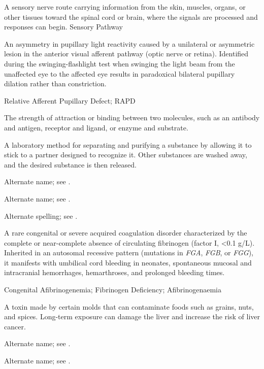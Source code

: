  A sensory nerve route carrying information from the skin, muscles, organs, or other tissues toward the spinal cord or brain, where the signals are processed and responses can begin.
\synonyms
Sensory Pathway

 An asymmetry in pupillary light reactivity caused by a unilateral or asymmetric lesion in the anterior visual afferent pathway (optic nerve or retina). Identified during the swinging-flashlight test when swinging the light beam from the unaffected eye to the affected eye results in paradoxical bilateral pupillary dilation rather than constriction.

\synonyms
Relative Afferent Pupillary Defect; RAPD

 The strength of attraction or binding between two molecules, such as an antibody and antigen, receptor and ligand, or enzyme and substrate.

 A laboratory method for separating and purifying a substance by allowing it to stick to a partner designed to recognize it. Other substances are washed away, and the desired substance is then released.

 Alternate name; see .

 Alternate name; see .

 Alternate spelling; see .

 A rare congenital or severe acquired coagulation disorder characterized by the complete or near-complete absence of circulating fibrinogen (factor I, <0.1 g/L). Inherited in an autosomal recessive pattern (mutations in \textit{FGA}, \textit{FGB}, or \textit{FGG}), it manifests with umbilical cord bleeding in neonates, spontaneous mucosal and intracranial hemorrhages, hemarthroses, and prolonged bleeding times.

\synonyms
Congenital Afibrinogenemia; Fibrinogen Deficiency; Afibrinogenaemia

 A toxin made by certain molds that can contaminate foods such as grains, nuts, and spices. Long-term exposure can damage the liver and increase the risk of liver cancer.

 Alternate name; see .

 Alternate name; see .

